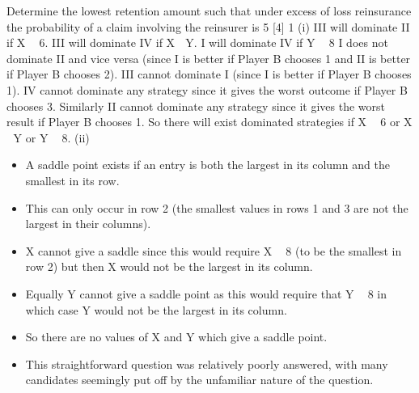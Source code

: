 \documentclass[a4paper,12pt]{article}
\begin{document}
Determine the lowest retention amount such that under excess of loss
reinsurance the probability of a claim involving the reinsurer is 5%
[4]
\newpage
1
(i)
III will dominate II if X  6.
III will dominate IV if X  Y.
I will dominate IV if Y  8
I does not dominate II and vice versa (since I is better if Player B chooses 1
and II is better if Player B chooses 2).
III cannot dominate I (since I is better if Player B chooses 1).
IV cannot dominate any strategy since it gives the worst outcome if Player B
chooses 3.
Similarly II cannot dominate any strategy since it gives the worst result if
Player B chooses 1.
So there will exist dominated strategies if X  6 or X  Y or Y  8.
(ii)
\begin{itemize}
\item A saddle point exists if an entry is both the largest in its column and the
smallest in its row.
\item This can only occur in row 2 (the smallest values in rows 1 and 3 are not the
largest in their columns).
\item X cannot give a saddle since this would require X  8 (to be the smallest in
row 2) but then X would not be the largest in its column.
\item Equally Y cannot give a saddle point as this would require that Y  8 in which
case Y would not be the largest in its column.
\item 
So there are no values of X and Y which give a saddle point.
\item 
This straightforward question was relatively poorly answered, with many candidates
seemingly put off by the unfamiliar nature of the question.
\end{itemize}
\end{document}
